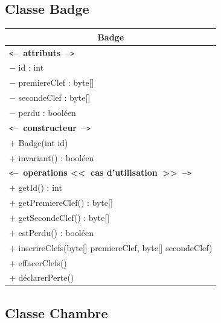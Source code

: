 \documentclass[11pt,article]{article}
\newcommand{\cmt}[1]{\texttt{<}\textbf{--~#1~--}\texttt{>}}
\begin{document}
\subsection{Classe \textsf{Badge}}

\begin{center}
\begin{longtable}{|p{15cm}|}
\hline
\multicolumn{1}{|c|}{{\Large \textsf{Badge}}} \\
\hline
\cmt{attributs}\\
$-$ id : int \\
$-$ premiereClef : byte[] \\
$-$ secondeClef : byte[] \\
$-$ perdu : booléen \\
\hline
\cmt{constructeur} \\
$+$ Badge(int id)\\
$+$ invariant() : booléen\\
\cmt{operations <<~cas d'utilisation~>>} \\
$+$ getId() : int \\
$+$ getPremiereClef() : byte[] \\
$+$ getSecondeClef() : byte[] \\
$+$ estPerdu() : booléen \\
$+$ inscrireClefs(byte[] premiereClef, byte[] secondeClef) \\
$+$ effacerClefs() \\
$+$ déclarerPerte() \\
\hline
\end{longtable}
\end{center}
\clearpage
\newpage

\subsection{Classe \textsf{Chambre}}
\end{document}
